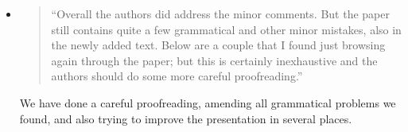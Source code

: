 
\begin{itemize}


\item \begin{quote}
``Overall the authors did address the minor comments. But the paper
still contains quite a few grammatical and other minor mistakes, also
in the newly added text. Below are a couple that I found just browsing
again through the paper; but this is certainly inexhaustive and the
authors should do some more careful proofreading.''
\end{quote}
\Mark
 We have done a  careful proofreading,   amending all 
grammatical problems we found, and also trying to improve the
presentation in several places. 


\end{itemize}
